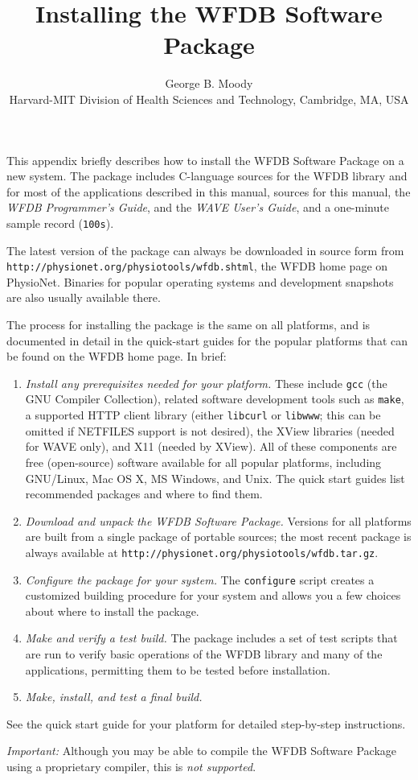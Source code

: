 \documentclass[twoside]{article}
\title{Installing the WFDB Software Package}
\author{George B. Moody\\
Harvard-MIT Division of Health Sciences and Technology, Cambridge, MA, USA}
\date{}
\begin{document}
\setcounter{page}{FIRSTPAGE}

\maketitle

This appendix briefly describes how to install the WFDB Software Package
on a new system.  The package includes C-language sources for the WFDB
library and for most of the applications described in this manual, sources
for this manual, the {\em WFDB Programmer's Guide}, and the
{\em WAVE User's Guide}, and a one-minute sample record ({\tt 100s}).

The latest version of the package can always be downloaded in
source form from {\tt http://physio\-net.org/\-physio\-tools/\-wfdb.shtml},
the WFDB home page on PhysioNet.  Binaries for popular operating systems and
development snapshots are also usually available there.

The process for installing the package is the same on all platforms, and
is documented in detail in the quick-start guides for the popular platforms
that can be found on the WFDB home page.  In brief:

\begin{enumerate}
\item
\emph{Install any prerequisites needed for your platform.}  These include
{\tt gcc} (the GNU Compiler Collection), related software development tools
such as {\tt make}, a supported HTTP client library (either {\tt libcurl} or
{\tt libwww}; this can be omitted if NETFILES support is not desired), the
XView libraries (needed for WAVE only), and X11 (needed by XView). All of these
components are free (open-source) software available for all popular platforms,
including GNU/Linux, Mac OS X, MS Windows, and Unix.  The quick start guides
list recommended packages and where to find them.

\item
\emph{Download and unpack the WFDB Software Package.}  Versions for all
platforms are built from a single package of portable sources;  the most
recent package is always available at
{\tt http://physio\-net.org/physio\-tools/wfdb.tar.gz}.

\item
\emph{Configure the package for your system.}  The {\tt configure} script
creates a customized building procedure for your system and allows you
a few choices about where to install the package.

\item
\emph{Make and verify a test build.}  The package includes a set of test
scripts that are run to verify basic operations of the WFDB library and
many of the applications, permitting them to be tested before installation.

\item
\emph{Make, install, and test a final build.}
\end{enumerate}

See the quick start guide for your platform for detailed step-by-step
instructions.

\emph{Important:} Although you may be able to compile the WFDB Software Package
using a proprietary compiler, this is \emph{not supported}.
\end{document}
